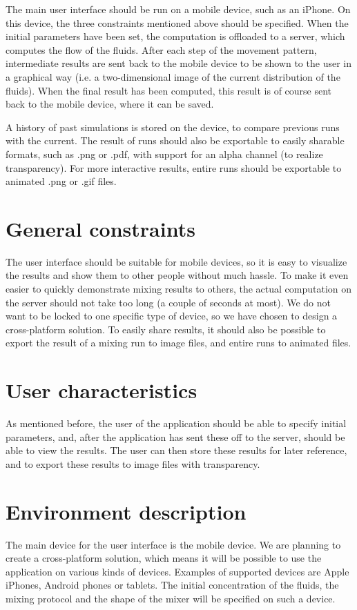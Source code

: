The main user interface should be run on a mobile device, such as an iPhone. On this device, the three constraints mentioned above should be specified. When the initial parameters have been set, the computation is offloaded to a server, which computes the flow of the fluids. After each step of the movement pattern, intermediate results are sent back to the mobile device to be shown to the user in a graphical way (i.e. a two-dimensional image of the current distribution of the fluids). When the final result has been computed, this result is of course sent back to the mobile device, where it can be saved.

A history of past simulations is stored on the device, to compare previous runs with the current. The result of runs should also be exportable to easily sharable formats, such as .png or .pdf, with support for an alpha channel (to realize transparency). For more interactive results, entire runs should be exportable to animated .png or .gif files.

\section{General constraints}
The user interface should be suitable for mobile devices, so it is easy to visualize the results and show them to other people without much hassle. To make it even easier to quickly demonstrate mixing results to others, the actual computation on the server should not take too long (a couple of seconds at most). We do not want to be locked to one specific type of device, so we have chosen to design a cross-platform solution. To easily share results, it should also be possible to export the result of a mixing run to image files, and entire runs to animated files.

\section{User characteristics}
As mentioned before, the user of the application should be able to specify initial parameters, and, after the application has sent these off to the server, should be able to view the results. The user can then store these results for later reference, and to export these results to image files with transparency.

\section{Environment description}
The main device for the user interface is the mobile device. We are planning to create a cross-platform solution, which means it will be possible to use the application on various kinds of devices. Examples of supported devices are Apple iPhones, Android phones or tablets. The initial concentration of the fluids, the mixing protocol and the shape of the mixer will be specified on such a device.

